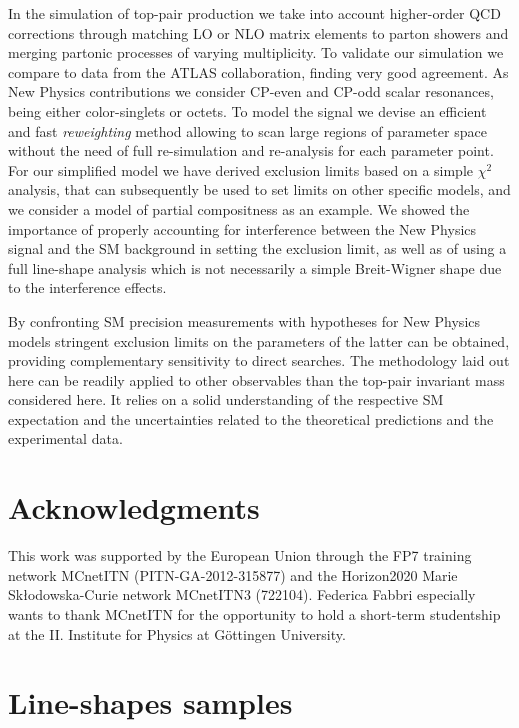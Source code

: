 \documentclass[aps,prd,amsmath,amssymb,superscriptaddress, preprintnumbers,preprint,nofootinbib,a4paper]{revtex4}
\begin{document}
In the simulation of top-pair production we take into account higher-order QCD corrections through
matching LO or NLO matrix elements to parton showers and merging partonic processes of varying
multiplicity. To validate our simulation we compare to data from the ATLAS collaboration, finding
very good agreement. As New Physics contributions we consider CP-even and CP-odd scalar resonances,
being either color-singlets or octets. To model the signal we devise an efficient and fast
\emph{reweighting} method allowing to scan large regions of parameter space without the need of
full re-simulation and re-analysis for each parameter point. For our simplified model we have
derived exclusion limits based on a simple $\chi^2$ analysis, that can subsequently be used to
set limits on other specific models, and we consider a model of partial compositness as an example. 
We showed the importance of properly accounting for interference between the New Physics signal and
the SM background in setting the exclusion limit, as well as of using a full line-shape analysis
which is not necessarily a simple Breit-Wigner shape due to the interference effects.

By confronting SM precision measurements with hypotheses for New Physics models stringent exclusion
limits on the parameters of the latter can be obtained, providing complementary sensitivity to
direct searches. The methodology laid out here can be readily applied to other observables than the
top-pair invariant mass considered here. It relies on a solid understanding of the respective
SM expectation and the uncertainties related to the theoretical predictions and the experimental
data.   

\section*{Acknowledgments}

This work was supported by the European Union through the FP7 training network MCnetITN
(PITN-GA-2012-315877) and the Horizon2020 Marie Sk{\l}odowska-Curie network MCnetITN3 (722104).
Federica Fabbri especially wants to thank MCnetITN for the opportunity to hold a short-term
studentship at the II. Institute for Physics at G\"ottingen University. 

\appendix
    \section{Line-shapes samples}
\label{app:lineshapes}
\end{document}
